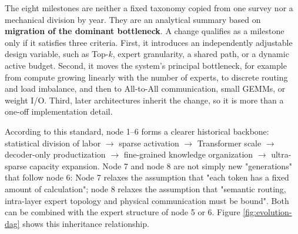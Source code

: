 \documentclass[10pt,a4paper,fontset=none]{ctexart}
\newcommand{\term}[1]{\textbf{#1}}
\begin{document}
The eight milestones are neither a fixed taxonomy copied from one survey nor a mechanical division by year. They are an analytical summary based on \term{migration of the dominant bottleneck}. A change qualifies as a milestone only if it satisfies three criteria. First, it introduces an independently adjustable design variable, such as Top-$k$, expert granularity, a shared path, or a dynamic active budget. Second, it moves the system's principal bottleneck, for example from compute growing linearly with the number of experts, to discrete routing and load imbalance, and then to All-to-All communication, small GEMMs, or weight I/O. Third, later architectures inherit the change, so it is more than a one-off implementation detail.

According to this standard, node 1--6 forms a clearer historical backbone: statistical division of labor $\rightarrow$ sparse activation $\rightarrow$ Transformer scale $\rightarrow$ decoder-only productization $\rightarrow$ fine-grained knowledge organization $\rightarrow$ ultra-sparse capacity expansion. Node 7 and node 8 are not simply new "generations" that follow node 6: Node 7 relaxes the assumption that "each token has a fixed amount of calculation"; node 8 relaxes the assumption that "semantic routing, intra-layer expert topology and physical communication must be bound". Both can be combined with the expert structure of node 5 or 6. Figure \ref{fig:evolution-dag} shows this inheritance relationship.
\end{document}
